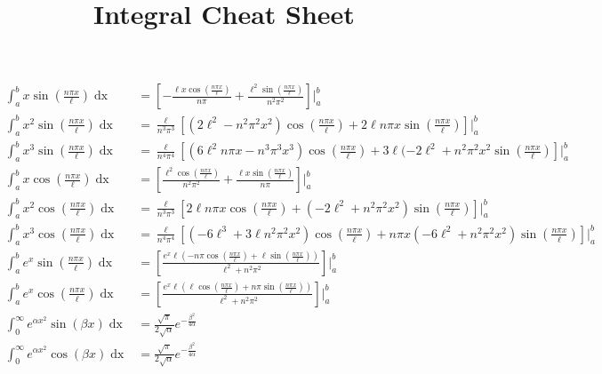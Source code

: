 \documentclass[fleqn]{article}
\title{Integral Cheat Sheet}
\date{}
\begin{document}
\maketitle
\begin{align*}
\int_{a}^{b}x\sin{\left(\frac{n\pi x}{\ell}\right)}\mathop{dx} &= \left[-\frac{\ell x \cos{\left( \frac{n \pi x}{\ell}\right)}}{n\pi} + \frac{\ell^{2}\sin{\left( \frac{n \pi x}{\ell}\right)}}{n^{2}\pi^{2}}\right]\Bigg|_{a}^{b}\\
%
\int_{a}^{b}x^{2}\sin{\left(\frac{n\pi x}{\ell}\right)}\mathop{dx} &= \frac{\ell}{n^{3}\pi^{3}}\left[(2\ell^{2}-n^{2}\pi^{2}x^{2})\cos{\left(\frac{n\pi x}{\ell}\right)} + 2\ell n\pi x\sin{\left(\frac{n\pi x}{\ell}\right)}\right]\Bigg|_{a}^{b}\\
%
\int_{a}^{b}x^{3}\sin{\left(\frac{n\pi x}{\ell}\right)}\mathop{dx} &= \frac{\ell}{n^{4}\pi^{4}}\left[(6\ell^{2}n\pi x - n^{3}\pi^{3}x^{3})\cos{\left(\frac{n\pi x}{\ell}\right)}  +3\ell(-2\ell^{2} + n^{2}\pi^{2}x^{2}\sin{\left(\frac{n\pi x}{\ell}\right)}\right]\Bigg|_{a}^{b}\\
%
\int_{a}^{b}x\cos{\left(\frac{n\pi x}{\ell}\right)}\mathop{dx} &= \left[\frac{\ell^{2}\cos{\left(\frac{n\pi x}{\ell}\right)}}{n^{2}\pi^{2}} + \frac{\ell x \sin{\left(\frac{n\pi x}{\ell}\right)}}{n\pi}\right]\Bigg|_{a}^{b}\\
%
\int_{a}^{b}x^{2}\cos{\left(\frac{n\pi x}{\ell}\right)}\mathop{dx} &= \frac{\ell}{n^{3}\pi^{3}}\left[2\ell n\pi x\cos{\left(\frac{n\pi x}{\ell}\right)} + \left(-2\ell^{2}+ n^{2}\pi^{2}x^{2}\right)\sin{\left(\frac{n\pi x}{\ell}\right)}\right]\Bigg|_{a}^{b}\\
%
\int_{a}^{b}x^{3}\cos{\left(\frac{n\pi x}{\ell}\right)}\mathop{dx} &= \frac{\ell}{n^{4}\pi^{4}}\left[(-6\ell^{3} + 3\ell n^{2}\pi^{2}x^{2})\cos{\left(\frac{n\pi x}{\ell}\right)} + n\pi x(-6\ell^{2} + n^{2}\pi^{2}x^{2})\sin{\left(\frac{n\pi x}{\ell}\right)}\right]\Bigg|_{a}^{b}\\
%
\int_{a}^{b}e^{x}\sin{\left(\frac{n\pi x}{\ell}\right)}\mathop{dx} &= \left[\frac{e^{x}\ell\left(-n\pi\cos{\left(\frac{n\pi x}{\ell}\right)} + \ell\sin{\left(\frac{n\pi x}{\ell}\right)}\right)}{\ell^{2}+ n^{2}\pi^{2}}\right]\Bigg|_{a}^{b}\\
%
\int_{a}^{b}e^{x}\cos{\left(\frac{n\pi x}{\ell}\right)}\mathop{dx} &= \left[\frac{e^{x}\ell\left(\ell\cos{\left(\frac{n\pi x}{\ell}\right)} + n\pi\sin{\left(\frac{n\pi x}{\ell}\right)}\right)}{\ell^{2}+ n^{2}\pi^{2}}\right]\Bigg|_{a}^{b}\\
%
\int_{0}^{\infty}e^{\alpha x^{2}}\sin{(\beta x)}\mathop{dx} &= \frac{\sqrt{\pi}}{2\sqrt{\alpha}}e^{-\frac{\beta^{2}}{4\alpha}}\\
%
\int_{0}^{\infty}e^{\alpha x^{2}}\cos{(\beta x)}\mathop{dx} &= \frac{\sqrt{\pi}}{2\sqrt{\alpha}}e^{-\frac{\beta^{2}}{4\alpha}}\\
\end{align*}
\end{document}
